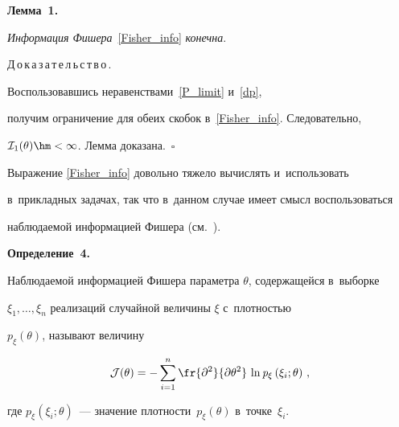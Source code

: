 \noindent


\textbf{Лемма~1.}


\textit{Информация Фишера}~\eqref{Fisher_info} \textit{конечна}. 








\smallskip





\noindent


Д\,о\,к\,а\,з\,а\,т\,е\,л\,ь\,с\,т\,в\,о\,.\ \ 


Воспользовавшись неравенствами~\eqref{P_limit} и~\eqref{dp}, 


получим ограничение для обеих скобок в~\eqref{Fisher_info}. Следовательно, 


$\mathcal{I}_1(\theta) \hm< \infty$. Лемма доказана.~\hfill$\square$








\smallskip








Выражение \eqref{Fisher_info} довольно тяжело вычислять и~использовать 


в~прикладных задачах, так что в~данном случае имеет смысл воспользоваться 


наблюдаемой информацией Фишера (см.~\cite{obs_fisher}).








\smallskip





\noindent


\textbf{Определение~4.}


Наблюдаемой информацией Фишера параметра $\theta$, содержащейся в~выборке 


$\xi_1, \dots,\xi_n$ реализаций случайной величины $\xi$ с~плотностью 


$\mathit{p}_\xi(\theta)$, называют величину


$$


\mathcal{J}(\theta) = -\sum\limits_{i=1}^n \fr{\partial^2}{\partial\theta^2}\,\ln 


\mathit{p}_\xi\left(\xi_i;\theta\right)\,,


$$


где $\mathit{p}_\xi(\xi_i;\theta)$~--- значение плотности~$\mathit{p}_\xi(\theta)$ в~точке~$\xi_i$.








